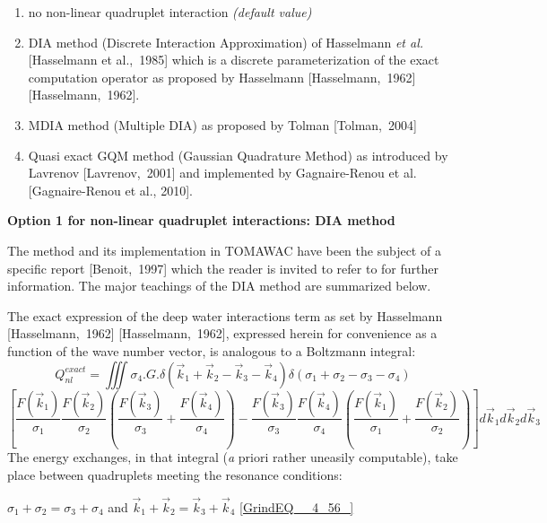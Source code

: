 \begin{enumerate}
\item  no non-linear quadruplet interaction \textit{(default value)}

\item  DIA method (Discrete Interaction Approximation) of Hasselmann \textit{et al.} [Hasselmann et al.,~1985] which is a discrete parameterization of the exact computation operator as proposed by Hasselmann [Hasselmann,~1962] [Hasselmann,~1962].

\item  MDIA method (Multiple DIA) as proposed by Tolman [Tolman,~2004]

\item  Quasi exact GQM method (Gaussian Quadrature Method) as introduced by Lavrenov [Lavrenov,~2001] and implemented by Gagnaire-Renou et al. [Gagnaire-Renou et al., 2010].
\end{enumerate}


{\bf  Option 1 for non-linear quadruplet interactions: DIA method}

 The method and its implementation in TOMAWAC have been the subject of a specific report [Benoit,~1997] which the reader is invited to refer to for further information. The major teachings of the DIA method are summarized below.

 The exact expression of the deep water interactions term as set by Hasselmann [Hasselmann,~1962] [Hasselmann,~1962], expressed herein for convenience as a function of the wave number vector, is analogous to a Boltzmann integral:
\[Q_{nl}^{exact} =\iiint  \sigma _{4} .G.\delta \left(\vec{k}_{1} +\vec{k}_{2} -\vec{k}_{3} -\vec{k}_{4} \right)\delta \left(\sigma _{1} +\sigma _{2} -\sigma _{3} -\sigma _{4} \right)\]
\begin{equation} \label{GrindEQ__4_55_}
\left[\frac{F(\vec{k}_{1} )}{\sigma _{1} } \frac{F(\vec{k}_{2} )}{\sigma _{2} } \left(\frac{F(\vec{k}_{3} )}{\sigma _{3} } +\frac{F(\vec{k}_{4} )}{\sigma _{4} } \right)-\frac{F(\vec{k}_{3} )}{\sigma _{3} } \frac{F(\vec{k}_{4} )}{\sigma _{4} } \left(\frac{F(\vec{k}_{1} )}{\sigma _{1} } +\frac{F(\vec{k}_{2} )}{\sigma _{2} } \right)\right]d\vec{k}_{1} d\vec{k}_{2} d\vec{k}_{3}
\end{equation}
The energy exchanges, in that integral (\textit{a }priori rather uneasily computable), take place between quadruplets meeting the resonance conditions:

$\sigma _{1} +\sigma _{2} =\sigma _{3} +\sigma _{4} $  and  $\vec{k}_{1} +\vec{k}_{2} =\vec{k}_{3} +\vec{k}_{4} $ \eqref{GrindEQ__4_56_}

